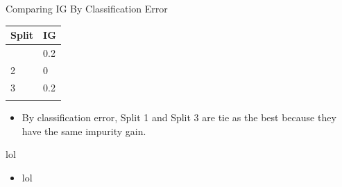 \documentclass[
  ignorenonframetext,
]{beamer}
\providecommand{\tightlist}{%
  \setlength{\itemsep}{0pt}\setlength{\parskip}{0pt}}\usepackage{longtable,booktabs,array}
\begin{document}
\begin{frame}{Comparing IG By Classification Error}
\label{comparing-ig-by-classification-error}
\begin{longtable}[]{@{}ll@{}}
\toprule\noalign{}
Split & IG \\
\midrule\noalign{}
\endhead
1 & 0.2 \\
2 & 0 \\
3 & 0.2 \\
\bottomrule\noalign{}
\end{longtable}

\begin{itemize}
\tightlist
\item
  By classification error, Split 1 and Split 3 are tie as the best
  because they have the same impurity gain.
\end{itemize}
\end{frame}

\begin{frame}{lol}
\label{lol}
\begin{itemize}
\tightlist
\item
  lol
\end{itemize}
\end{frame}
\end{document}
